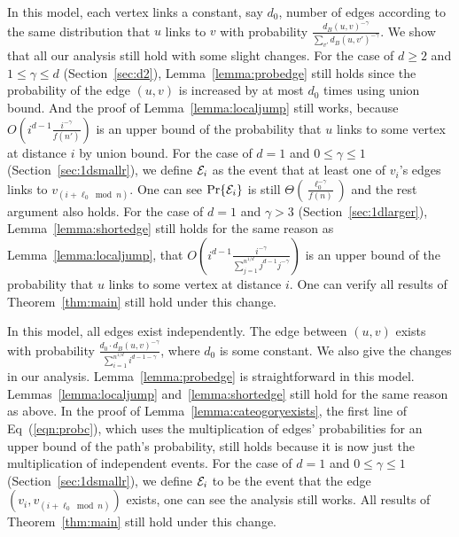 \documentclass[11pt]{article}
\begin{document}
 In this model, each vertex links a constant, say $d_0$, number of edges according to the same distribution that $u$ links to $v$ with probability $\frac{d_B(u,v)^{-\gamma}}{\sum_{v'}d_B(u,v')^{-\gamma}}$. We show that all our analysis still hold with some slight changes. For the case of $d\geq2$ and $1\leq\gamma\leq d$ (Section~\ref{sec:d2}), Lemma~\ref{lemma:probedge} still holds since the probability of the edge $(u,v)$ is increased by at most $d_0$ times using union bound. And the proof of Lemma~\ref{lemma:localjump} still works, because $O(i^{d-1}\frac{i^{-\gamma}}{f(n')})$ is an upper bound of the probability that $u$ links to some vertex at distance $i$ by union bound. For the case of $d=1$ and $0\leq\gamma\leq1$ (Section~\ref{sec:1dsmallr}), we define ${\cal E}_i$ as the event that at least one of $v_i$'s edges links to $v_{(i+\ell_0\bmod n)}$. One can see $\Pr\{{\cal E}_i\}$ is still $\Theta(\frac{\ell_0^{-\gamma}}{f(n)})$ and the rest argument also holds. For the case of $d=1$ and $\gamma>3$ (Section~\ref{sec:1dlarger}), Lemma~\ref{lemma:shortedge} still holds for the same reason as Lemma~\ref{lemma:localjump}, that $O(i^{d-1}\frac{i^{-\gamma}}{\sum_{j=1}^{n^{1/d}}j^{d-1}j^{-\gamma}})$ is an upper bound of the probability that $u$ links to some vertex at distance $i$. One can verify all results of Theorem~\ref{thm:main} still hold under this change.

\vspace{\topsep}

 In this model, all edges exist independently. The edge between $(u,v)$ exists with probability $\frac{d_0\cdot d_B(u,v)^{-\gamma}}{\sum_{i=1}^{n^{1/d}}i^{d-1-\gamma}}$, where $d_0$ is some constant. We also give the changes in our analysis. Lemma~\ref{lemma:probedge} is straightforward in this model. Lemmas~\ref{lemma:localjump} and~\ref{lemma:shortedge} still hold for the same reason as above. In the proof of Lemma~\ref{lemma:cateogoryexists}, the first line of Eq~(\ref{eqn:probc}), which uses the multiplication of edges' probabilities for an upper bound of the path's probability, still holds because it is now just the multiplication of independent events. For the case of $d=1$ and $0\leq\gamma\leq1$ (Section~\ref{sec:1dsmallr}), we define ${\cal E}_i$ to be the event that the edge $(v_i,v_{(i+\ell_0\bmod n)})$ exists, one can see the analysis still works. All results of Theorem~\ref{thm:main} still hold under this change.

\vspace{\topsep}
\end{document}
